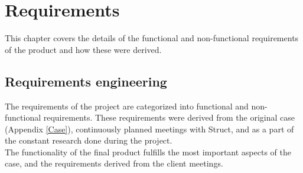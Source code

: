 
\chapter{Requirements} %

\label{Requirements} %

This chapter covers the details of the functional and non-functional requirements of the product and how these were derived.

\section{Requirements engineering}
The requirements of the project are categorized into functional and non-functional requirements. These requirements were derived from the original case (Appendix \ref{Case}), continuously planned meetings with \gls{Struct}, and as a part of the constant research done during the project. \\
The functionality of the final product fulfills the most important aspects of the case, and the requirements derived from the client meetings.

